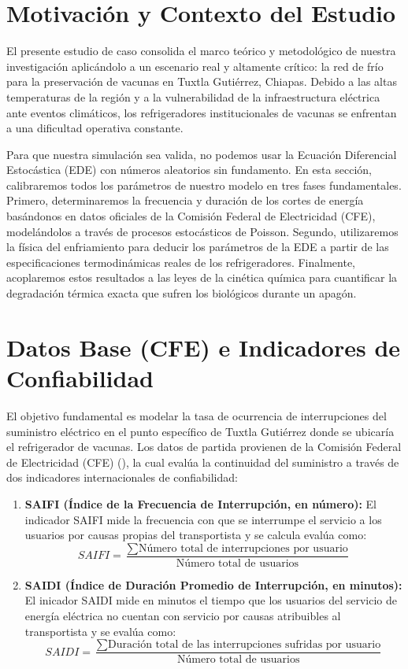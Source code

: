 \documentclass[
  spanish,
  letterpaper,
  DIV=11,
  numbers=noendperiod]{scrreprt}
\theoremstyle{plain}
\theoremstyle{definition}
\theoremstyle{remark}
\begin{document}
\section{Motivación y Contexto del
Estudio}\label{motivaciuxf3n-y-contexto-del-estudio}

El presente estudio de caso consolida el marco teórico y metodológico de
nuestra investigación aplicándolo a un escenario real y altamente
crítico: la red de frío para la preservación de vacunas en Tuxtla
Gutiérrez, Chiapas. Debido a las altas temperaturas de la región y a la
vulnerabilidad de la infraestructura eléctrica ante eventos climáticos,
los refrigeradores institucionales de vacunas se enfrentan a una
dificultad operativa constante.

Para que nuestra simulación sea valida, no podemos usar la Ecuación
Diferencial Estocástica (EDE) con números aleatorios sin fundamento. En
esta sección, calibraremos todos los parámetros de nuestro modelo en
tres fases fundamentales. Primero, determinaremos la frecuencia y
duración de los cortes de energía basándonos en datos oficiales de la
Comisión Federal de Electricidad (CFE), modelándolos a través de
procesos estocásticos de Poisson. Segundo, utilizaremos la física del
enfriamiento para deducir los parámetros de la EDE a partir de las
especificaciones termodinámicas reales de los refrigeradores.
Finalmente, acoplaremos estos resultados a las leyes de la cinética
química para cuantificar la degradación térmica exacta que sufren los
biológicos durante un apagón.

\section{Datos Base (CFE) e Indicadores de
Confiabilidad}\label{datos-base-cfe-e-indicadores-de-confiabilidad}

El objetivo fundamental es modelar la tasa de ocurrencia de
interrupciones del suministro eléctrico en el punto específico de Tuxtla
Gutiérrez donde se ubicaría el refrigerador de vacunas. Los datos de
partida provienen de la Comisión Federal de Electricidad (CFE)
(),
la cual evalúa la continuidad del suministro a través de dos indicadores
internacionales de confiabilidad:

\begin{enumerate}
\def\labelenumi{\arabic{enumi}.}
\item
  \textbf{SAIFI (Índice de la Frecuencia de Interrupción, en número):}
  El indicador SAIFI mide la frecuencia con que se interrumpe el
  servicio a los usuarios por causas propias del transportista y se
  calcula evalúa como: \[
  SAIFI = \frac{\sum \text{Número total de interrupciones por usuario}}{\text{Número total de usuarios}}
  \]
\item
  \textbf{SAIDI (Índice de Duración Promedio de Interrupción, en
  minutos):} El inicador SAIDI mide en minutos el tiempo que los
  usuarios del servicio de energía eléctrica no cuentan con servicio por
  causas atribuibles al transportista y se evalúa como: \[
  SAIDI = \frac{\sum \text{Duración total de las interrupciones sufridas por usuario}}{\text{Número total de usuarios}}
  \]
\end{enumerate}
\end{document}
